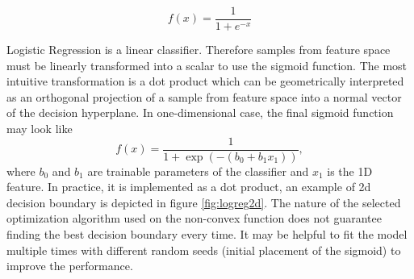 \documentclass{article}
\begin{document}
\begin{equation}
    f(x) = \frac{1}{1 + e^{-x}}
    \label{eq:sigmoid}
\end{equation}


Logistic Regression is a linear classifier. 
Therefore samples from feature space must be linearly transformed into a scalar to use the sigmoid function. 
The most intuitive transformation is a dot product which can be geometrically interpreted as an orthogonal projection of a sample from feature space into a normal vector of the decision hyperplane.
In one-dimensional case, the final sigmoid function may look like 
$$
    f(x) = \frac{1}{1 + \exp{\left(-(b_0 + b_1 x_1)\right)}},
$$
where $b_0$ and $b_1$ are trainable parameters of the classifier and $x_1$ is the 1D feature.
In practice, it is implemented as a dot product, an example of 2d decision boundary is depicted in figure \ref{fig:logreg2d}.
The nature of the selected optimization algorithm used on the non-convex function does not guarantee finding the best decision boundary every time. It may be helpful to fit the model multiple times with different random seeds (initial placement of the sigmoid) to improve the performance.
\end{document}
